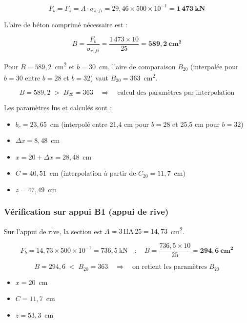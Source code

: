 \[
F_b = F_s = A \cdot \sigma_{s,fi} = 29{,}46 \times 500 \times 10^{-1} = \mathbf{1\,473~\text{kN}}
\]

L'aire de béton comprimé nécessaire est :

\[
B = \frac{F_b}{\sigma_{c,fi}} = \frac{1\,473 \times 10}{25} = \mathbf{589{,}2~\text{cm}^2}
\]

Pour $B = 589{,}2$~cm\textsuperscript{2} et $b = 30$~cm, l'aire de comparaison $B_{20}$ (interpolée pour $b = 30$ entre $b = 28$ et $b = 32$) vaut $B_{20} = 363$~cm\textsuperscript{2}.

\[
B = 589{,}2 \;>\; B_{20} = 363
\quad\Longrightarrow\quad
\text{calcul des paramètres par interpolation}
\]

Les paramètres lus et calculés sont :
\begin{itemize}
  \item $b_c = 23{,}65$~cm (interpolé entre 21,4 cm pour $b=28$ et 25,5 cm pour $b=32$)
  \item $\Delta x = 8{,}48$~cm
  \item $x = 20 + \Delta x = 28{,}48$~cm
  \item $C = 40{,}51$~cm (interpolation à partir de $C_{20} = 11{,}7$~cm)
  \item $z = 47{,}49$~cm
\end{itemize}


\subsubsection{Vérification sur appui B1 (appui de rive)}

Sur l'appui de rive, la section est $A = 3 \, \text{HA}\,25 = 14{,}73$~cm\textsuperscript{2}.

\[
F_b = 14{,}73 \times 500 \times 10^{-1} = 736{,}5~\text{kN}
\quad ; \quad
B = \frac{736{,}5 \times 10}{25} = \mathbf{294{,}6~\text{cm}^2}
\]

\[
B = 294{,}6 \;<\; B_{20} = 363
\quad\Longrightarrow\quad
\text{on retient les paramètres } B_{20}
\]

\begin{itemize}
  \item $x = 20$~cm
  \item $C = 11{,}7$~cm
  \item $z = 53{,}3$~cm
\end{itemize}

